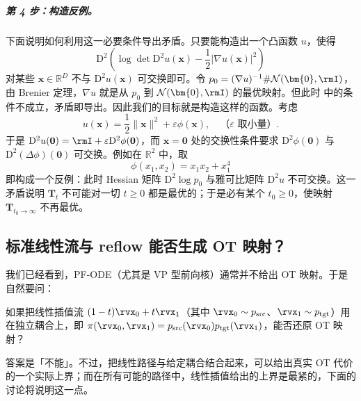 \subparagraph{第 4 步：构造反例。} 下面说明如何利用这一必要条件导出矛盾。只要能构造出一个凸函数 $u$，使得
\[
\mathrm{D}^2 \left( \log \det \mathrm{D}^2 u(\mathbf{x}) - \frac{1}{2} \lvert \nabla u(\mathbf{x}) \rvert^2 \right)
\]
对某些 $\mathbf{x} \in \mathbb{R}^D$ 不与 $\mathrm{D}^2 u(\mathbf{x})$ 可交换即可。令 $p_0 = (\nabla u)^{-1} \# \mathcal{N}(\bm{0}, \rmI)$，由 Brenier 定理，$\nabla u$ 就是从 $p_0$ 到 $\mathcal{N}(\bm{0}, \rmI)$ 的最优映射。但此时  中的条件不成立，矛盾即导出。因此我们的目标就是构造这样的函数。考虑
\[
u(\mathbf{x}) = \frac{1}{2} \|\mathbf{x}\|^2 + \varepsilon \phi(\mathbf{x}), \quad \text{（$\varepsilon$ 取小量）}.
\]
于是 $\mathrm{D}^2 u(\mathbf{0}) = \rmI + \varepsilon \mathrm{D}^2 \phi(\mathbf{0})$，而 $\mathbf{x} = \mathbf{0}$ 处的交换性条件要求 $\mathrm{D}^2 \phi(\mathbf{0})$ 与 $\mathrm{D}^2 (\Delta \phi)(\mathbf{0})$ 可交换。例如在 $\mathbb{R}^2$ 中，取
\[
\phi(x_1, x_2) = x_1 x_2 + x_1^4
\]
即构成一个反例：此时 Hessian 矩阵 $\mathrm{D}^2 \log p_0$ 与雅可比矩阵 $\mathrm{D}^2 u$ 不可交换。这一矛盾说明 $\mathbf{T}_t$ 不可能对一切 $t \geq 0$ 都是最优的；于是必有某个 $t_0 \geq 0$，使映射 $\mathbf{T}_{t_0 \to \infty}$ 不再最优。


\subsection{标准线性流与 reflow 能否生成 OT 映射？}\label{subsec:ot-linear-reflow}
我们已经看到，PF-ODE（尤其是 VP 型前向核）通常并不给出 OT 映射。于是自然要问：
\begin{question}
如果把线性插值流 $(1-t)\rvx_0 + t \rvx_1$（其中 $\rvx_0\sim p_{\mathrm{src}}$、$\rvx_1\sim p_{\mathrm{tgt}}$）用在独立耦合上，即 $\pi(\rvx_0, \rvx_1) = p_{\mathrm{src}}(\rvx_0)p_{\mathrm{tgt}}(\rvx_1)$，能否还原 OT 映射？
\end{question}
答案是「不能」。不过，把线性路径与给定耦合结合起来，可以给出真实 OT 代价的一个实际上界；而在所有可能的路径中，线性插值给出的上界是最紧的，下面的讨论将说明这一点。


